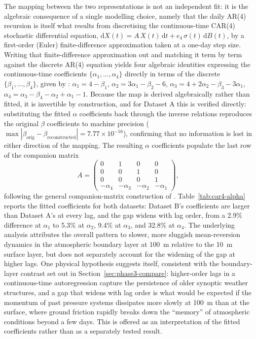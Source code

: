 The mapping between the two representations is not an independent fit: it is the algebraic consequence of a single modelling choice, namely that the daily AR(4) recursion is itself what results from discretising the continuous-time CAR(4) stochastic differential equation, $\mathrm dX(t) = A\,X(t)\,\mathrm dt + e_4\,\sigma(t)\,\mathrm dB(t)$, by a first-order (Euler) finite-difference approximation taken at a one-day step size. Writing that finite-difference approximation out and matching it term by term against the discrete AR(4) equation yields four algebraic identities expressing the continuous-time coefficients $\{\alpha_1,\dots,\alpha_4\}$ directly in terms of the discrete $\{\beta_1,\dots,\beta_4\}$, given by \citet{BenthSaltyteBenth2009}: $\alpha_1 = 4-\beta_1$, $\alpha_2 = 3\alpha_1 - \beta_2 - 6$, $\alpha_3 = 4 + 2\alpha_2 - \beta_3 - 3\alpha_1$, $\alpha_4 = \alpha_3 - \beta_4 - \alpha_2 + \alpha_1 - 1$. Because the map is derived algebraically rather than fitted, it is invertible by construction, and for Dataset A this is verified directly: substituting the fitted $\alpha$ coefficients back through the inverse relations reproduces the original $\beta$ coefficients to machine precision ($\max|\beta_{\text{orig}} - \beta_{\text{reconstructed}}| = 7.77\times 10^{-16}$), confirming that no information is lost in either direction of the mapping. The resulting $\alpha$ coefficients populate the last row of the companion matrix
\begin{equation}
A = \begin{pmatrix} 0 & 1 & 0 & 0 \\ 0 & 0 & 1 & 0 \\ 0 & 0 & 0 & 1 \\ -\alpha_4 & -\alpha_3 & -\alpha_2 & -\alpha_1 \end{pmatrix},
\end{equation}
following the general companion-matrix construction of \citet{BrockwellMarquardt2005}. Table~\ref{tab:car4-alpha} reports the fitted coefficients for both datasets: Dataset B's coefficients are larger than Dataset A's at every lag, and the gap widens with lag order, from a 2.9\% difference at $\alpha_1$ to 5.3\% at $\alpha_2$, 9.4\% at $\alpha_3$, and 32.8\% at $\alpha_4$. The underlying analysis attributes the overall pattern to slower, more sluggish mean-reversion dynamics in the atmospheric boundary layer at 100~m relative to the 10~m surface layer, but does not separately account for the widening of the gap at higher lags. One physical hypothesis suggests itself, consistent with the boundary-layer contrast set out in Section~\ref{sec:phase3-compare}: higher-order lags in a continuous-time autoregression capture the persistence of older synoptic weather structures, and a gap that widens with lag order is what would be expected if the momentum of past pressure systems dissipates more slowly at 100~m than at the surface, where ground friction rapidly breaks down the ``memory'' of atmospheric conditions beyond a few days. This is offered as an interpretation of the fitted coefficients rather than as a separately tested result.

